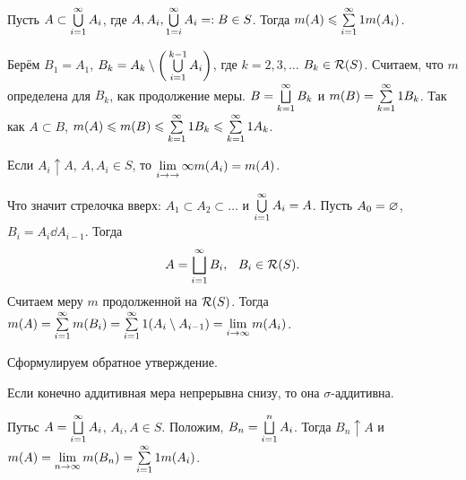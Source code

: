 \begin{Ut}[полуаддитивность]
  Пусть $A\subset \bigcup\limits_{i=1}^\infty A_i$, где $A,A_i,\bigcup\limits_{1=i}^\infty A_i=: B\in S$. Тогда $m(A)\leqslant \sum\limits_{{i}={1}}^\infty1m(A_i)$.
\end{Ut}
\begin{Proof}
  Берём $B_1 = A_1$, $B_k = A_k\setminus \bigg(\bigcup\limits_{i=1}^{k-1} A_i\bigg)$, где $k=2,3,\dots$ $B_k\in \mathcal R(S)$. Считаем, что $m$ определена для $B_k$, как продолжение меры. $B = \bigsqcup\limits_{k=1}^\infty B_k$ и $m(B) = \sum\limits_{{k}={1}}^\infty1B_k$. Так как $A\subset B$, $m(A)\leqslant m(B)\leqslant \sum\limits_{{k}={1}}^\infty1B_k\leqslant \sum\limits_{{k}={1}}^\infty1A_k$.
\end{Proof}
\begin{Ut}
  Если $A_i\uparrow A$, $A,A_i\in S$, то $\lim\limits_{i\rightarrow\rightarrow} \infty m(A_i) = m(A)$.
\end{Ut}
\begin{Proof}
  Что значит стрелочка вверх: $A_1\subset A_2\subset \dots$ и $\bigcup\limits_{i=1}^\infty A_i = A$. Пусть $A_0 = \varnothing$, $B_i = A_i\dd A_{i-1}$. Тогда
\[
  A = \DUN i1\infty B_i,\pau B_i\in\Rim(S).
\]
Считаем меру $m$ продолженной на $\mathcal R(S)$. Тогда $m(A) = \sum\limits_{i = 1}^{\infty} m(B_i) = \sum\limits_{{i}={1}}^\infty1(A_i\setminus A_{i-1}) = \lim\limits_{i\rightarrow\infty} m(A_i)$.
\end{Proof}
Сформулируем обратное утверждение.
\begin{Ut}
  Если конечно аддитивная мера непрерывна снизу, то она $\sigma$-аддитивна.
\end{Ut}

\begin{Proof}
  Путьс $A = \bigsqcup\limits_{i=1}^\infty A_i$, $A_i,A\in S$. Положим, $B_n = \bigsqcup\limits_{i=1}^{n} A_i$. Тогда $B_n\uparrow A$ и $m(A) = \lim\limits_{n\rightarrow\infty} m(B_n) = \sum\limits_{{i}={1}}^\infty1m(A_i)$.
\end{Proof}

